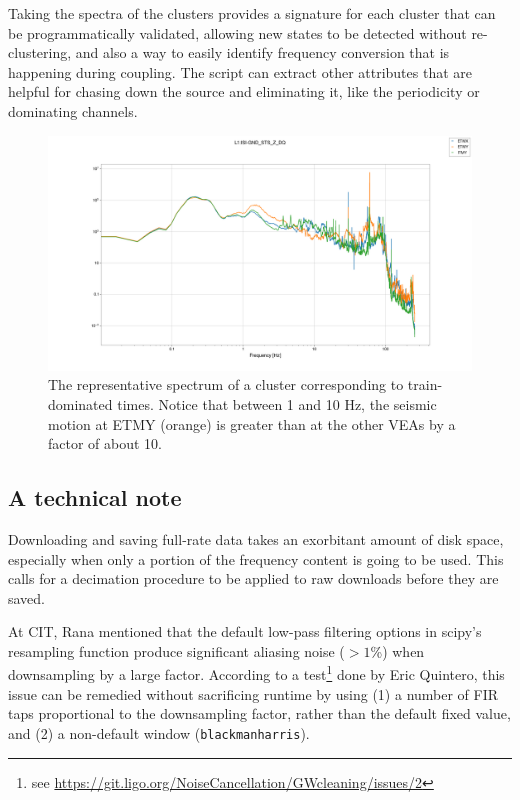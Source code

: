 \documentclass[colorlinks=true,pdfstartview=FitV,linkcolor=blue,
            citecolor=red,urlcolor=magenta]{ligodoc}
\begin{document}
Taking the spectra of the clusters provides a signature for each cluster that can be programmatically validated, allowing new states to be detected without re-clustering, and also a way to easily identify frequency conversion that is happening during coupling.
The script can extract other attributes that are helpful for chasing down the source and eliminating it, like the periodicity or dominating channels.

\begin{figure}
  \includegraphics[width=\textwidth]{assets/report2/0-L1:ISI-GND_STS_Z_DQ.png}
  \caption{The representative spectrum of a cluster corresponding to train-dominated times. Notice that between 1 and 10 Hz, the seismic motion at ETMY (orange) is greater than at the other VEAs by a factor of about 10.}
\end{figure}

\subsection{A technical note}
Downloading and saving full-rate data takes an exorbitant amount of disk space, especially when only a portion of the frequency content is going to be used.
This calls for a decimation procedure to be applied to raw downloads before they are saved.

At CIT, Rana mentioned that the default low-pass filtering options in scipy's resampling function produce significant aliasing noise ($>1$\%) when downsampling by a large factor.
According to a test\footnote{see \url{https://git.ligo.org/NoiseCancellation/GWcleaning/issues/2}} done by Eric Quintero, this issue can be remedied without sacrificing runtime by using (1) a number of FIR taps proportional to the downsampling factor, rather than the default fixed value, and (2) a non-default window (\texttt{blackmanharris}).
\end{document}
